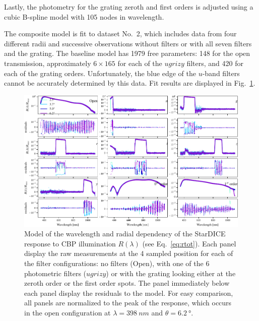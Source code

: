 Lastly, the photometry for the grating zeroth and first orders is
adjusted using a cubic B-spline model with \num{105} nodes in
wavelength.

The composite model is fit to dataset No.~2, which includes data
from four different radii and successive observations without filters
or with all seven filters and the grating. The baseline model has
\num{1979} free parameters: \num{148} for the open transmission,
approximately $6\times165$ for each of the $ugrizy$ filters, and
\num{420} for each of the grating orders. Unfortunately, the blue edge
of the $u$-band filters cannot be accurately determined by this
data. Fit results are displayed in
Fig.~\ref{fig:lambdathetafitresults}.

\begin{figure}
  \centering
  \includegraphics[width=1\linewidth]{./fig/lambdathetafitresults.pdf}
  \caption{Model of the wavelength and radial dependency of the
    StarDICE response to CBP illumination $R(\lambda)$ (see
    Eq.~\ref{eq:rtot}). Each panel display the raw measurements at the
    4 sampled position for each of the filter configurations: no
    filters (Open), with one of the 6 photometric filters ($ugrizy$)
    or with the grating looking either at the zeroth order or the
    first order spots. The panel immediately below each panel display
    the residuals to the model. For easy comparison, all panels are
    normalized to the peak of the response, which occurs in the open
    configuration at $\lambda = \SI{398}{nm}$ and
    $\theta = \SI{6.2}{\degree}$.  }
  \label{fig:lambdathetafitresults}
\end{figure}


